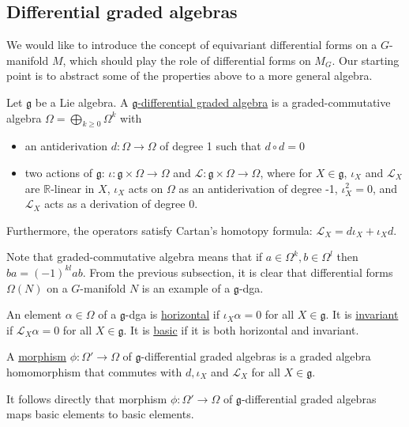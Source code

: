\subsection{Differential graded algebras}
We would like to introduce the concept of equivariant differential forms on a
$G$-manifold  $M$, which should play the role of differential forms on  $M_G$.
Our starting point is to abstract some of the properties above to a more
general algebra.
\begin{defn}
	Let $\mathfrak{g}$ be a Lie algebra. A \underline{$\mathfrak{g}$-differential graded
	algebra} is a graded-commutative algebra $\Omega= \bigoplus_{k\geq
	0}\Omega^k$ with 
	\begin{itemize}
		\item an antiderivation $d:\Omega\to\Omega$ of degree 1 such that
	$d\circ d = 0$
		\item two actions of $\mathfrak{g}$: $\iota:\mathfrak{g}\times\Omega\to\Omega$
			and  $\mathcal{L}:\mathfrak{g}\times\Omega\to\Omega$, where for
			$X\in\mathfrak{g}$,  $\iota_X$ and  $\mathcal{L}_X$ are
			$\mathbb{R}$-linear in $X$,  $\iota_X$ acts on  $\Omega$ as an
			antiderivation of degree -1,  $\iota_X^2 = 0$, and  $\mathcal{L}_X$
			acts as a derivation of degree 0.
	\end{itemize}
	Furthermore, the operators satisfy Cartan's homotopy formula:
	$\mathcal{L}_X= d\iota_X+\iota_Xd$.
\end{defn}
Note that graded-commutative algebra means that if $a\in
\Omega^k,b\in\Omega^l$ then $ba = (-1)^{kl}ab$. 
From the previous subsection, it is
clear that differential forms $\Omega(N)$ on a $G$-manifold  $N$ is an example
of a $\mathfrak{g}$-dga. 

\begin{defn}
	An element $\alpha\in\Omega$ of a $\mathfrak{g}$-dga is 
	\underline{horizontal} if $\iota_X\alpha=0$ for all $X\in\mathfrak{g}$. 
	It is \underline{invariant} if $\mathcal{L}_X\alpha = 0$ for all $X\in
	\mathfrak{g}$. It is \underline{basic} if it is both horizontal and
	invariant.
\end{defn}

\begin{defn} 
	A \underline{morphism} $\phi : \Omega' \to \Omega$ of
	$\mathfrak{g}$-differential graded algebras is a graded algebra homomorphism that
	commutes with  $d,\iota_X$ and  $\mathcal{L}_X$ for all $X\in\mathfrak{g}$.
\end{defn}
It follows directly that 
morphism $\phi : \Omega'\to \Omega$ of $\mathfrak{g}$-differential graded
algebras maps basic elements to basic elements.

